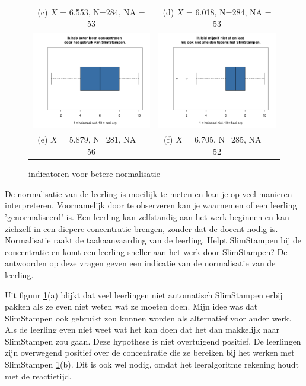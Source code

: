 \documentclass[12pt, a4paper]{article}
\begin{document}
\begin{figure}
\begin{tabular}{cc}
    (c) $\overline{X}$ = 6.553, N=284, NA = 53 & (d) $\overline{X}$ = 6.018, N=284, NA = 53 \\[6pt]
    \includegraphics[width=65mm]{28-BeterLerenConcentreren.png} & \includegraphics[width=65mm]{images/15-LaatNietAfleiden.png}\\
    (e) $\overline{X}$ = 5.879, N=281, NA = 56 & (f) $\overline{X}$ = 6.705, N=285, NA = 52  
    \end{tabular}
    \caption{indicatoren voor betere normalisatie}
    \label{fig:normalisatie}
    \end{figure}
De normalisatie van de leerling is moeilijk te meten en kan je op veel manieren interpreteren. Voornamelijk door te observeren kan je waarnemen of een leerling 'genormaliseerd' is. Een leerling kan zelfstandig aan het werk beginnen en kan zichzelf in een diepere concentratie brengen, zonder dat de docent nodig is. Normalisatie raakt de taakaanvaarding van de leerling. Helpt SlimStampen bij de concentratie en komt een leerling sneller aan het werk door SlimStampen? De antwoorden op deze vragen geven een indicatie van de normalisatie van de leerling.

Uit figuur \ref*{fig:normalisatie}(a) blijkt dat veel leerlingen niet automatisch SlimStampen erbij pakken als ze even niet weten wat ze moeten doen. Mijn idee was dat SlimStampen ook gebruikt zou kunnen worden als alternatief voor ander werk. Als de leerling even niet weet wat het kan doen dat het dan makkelijk naar SlimStampen zou gaan. Deze hypothese is niet overtuigend positief. 
De leerlingen zijn overwegend positief over de concentratie die ze bereiken bij het werken met SlimStampen \ref*{fig:normalisatie}(b). Dit is ook wel nodig, omdat het leeralgoritme rekening houdt met de reactietijd. 
\end{document}
